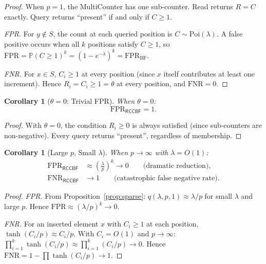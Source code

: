 \documentclass[11pt,a4paper]{article}
\newtheorem{corollary}[theorem]{Corollary}
\newcommand{\RCCBF}{\textsf{RCCBF}}
\newcommand{\FPR}{\mathrm{FPR}}
\newcommand{\FNR}{\mathrm{FNR}}
\newcommand{\Poi}{\mathrm{Poi}}
\newcommand{\Prob}{\mathbb{P}}
\begin{document}
\begin{proof}
When $p = 1$, the MultiCounter has one sub-counter.  Read returns
$R = C$ exactly.  Query returns ``present'' if and only if $C \ge 1$.

\emph{FPR.}  For $y \notin S$, the count at each queried position is
$C \sim \Poi(\lambda)$.  A false positive occurs when all $k$ positions
satisfy $C \ge 1$, so
$\FPR = \Prob(C \ge 1)^k = (1 - e^{-\lambda})^k = \FPR_{\mathrm{BF}}$.

\emph{FNR.}  For $x \in S$, $C_i \ge 1$ at every position (since $x$
itself contributes at least one increment).  Hence $R_i = C_i \ge 1
= \theta$ at every position, and $\FNR = 0$.
\end{proof}

\begin{corollary}[$\theta = 0$: Trivial FPR]\label{cor:theta0}
When $\theta = 0$:
\begin{equation}\label{eq:fpr-theta0}
  \FPR_{\RCCBF} = 1.
\end{equation}
\end{corollary}

\begin{proof}
With $\theta = 0$, the condition $R_i \ge 0$ is always satisfied (since
sub-counters are non-negative).  Every query returns ``present'',
regardless of membership.
\end{proof}

\begin{corollary}[Large $p$, Small $\lambda$]\label{cor:large-p-small-lam}
When $p \to \infty$ with $\lambda = O(1)$:
\begin{align}
  \FPR_{\RCCBF} &\approx \left(\frac{\lambda}{p}\right)^k \to 0
  \qquad\text{(dramatic reduction)}, \label{eq:fpr-large-p} \\
  \FNR_{\RCCBF} &\to 1
  \qquad\text{(catastrophic false negative rate)}.
  \label{eq:fnr-large-p}
\end{align}
\end{corollary}

\begin{proof}
\emph{FPR.}  From Proposition~\ref{prop:sparse}:
$q(\lambda, p, 1) \approx \lambda/p$ for small $\lambda$ and large $p$.
Hence $\FPR \approx (\lambda/p)^k \to 0$.

\emph{FNR.}  For an inserted element $x$ with $C_i \ge 1$ at each
position, $\tanh(C_i/p) \approx C_i/p$.  With $C_i = O(1)$ and
$p \to \infty$:
$\prod_{i=1}^{k}\tanh(C_i/p) \approx \prod_{i=1}^{k}(C_i/p) \to 0$.
Hence $\FNR = 1 - \prod \tanh(C_i/p) \to 1$.
\end{proof}
\end{document}
